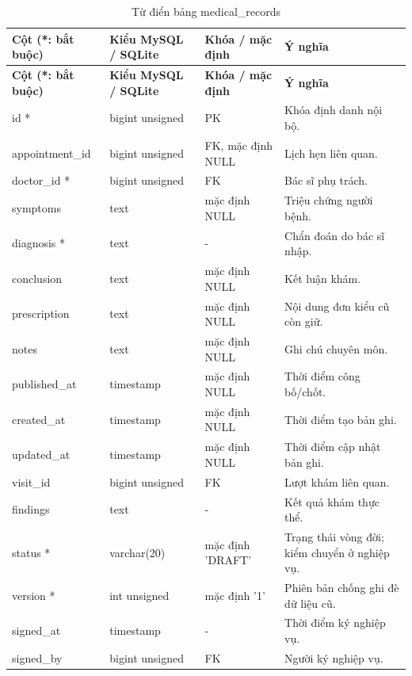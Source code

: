 {\fontsize{10}{12}\selectfont\setlength{\tabcolsep}{3pt}\renewcommand{\arraystretch}{1.12}
\begin{longtable}{@{}L{\textwidth-4.86pt\relax} L{\textwidth-3.96pt\relax} L{\textwidth-2.88pt\relax} L{\textwidth-6.3pt\relax}@{}}
\caption{Từ điển bảng medical\_\allowbreak{}records}\\
\toprule
\textbf{Cột (*:\allowbreak{} bắt buộc)} & \textbf{Kiểu My\allowbreak{}SQL /\allowbreak{} SQLite} & \textbf{Khóa /\allowbreak{} mặc định} & \textbf{Ý nghĩa}\\\midrule
\endfirsthead
\toprule
\textbf{Cột (*:\allowbreak{} bắt buộc)} & \textbf{Kiểu My\allowbreak{}SQL /\allowbreak{} SQLite} & \textbf{Khóa /\allowbreak{} mặc định} & \textbf{Ý nghĩa}\\\midrule
\endhead
\bottomrule\endlastfoot
id * & bigint unsigned & PK & Khóa định danh nội bộ.\allowbreak{}\\[1pt]
appointment\_\allowbreak{}id & bigint unsigned & FK, mặc định NULL & Lịch hẹn liên quan.\allowbreak{}\\[1pt]
doctor\_\allowbreak{}id * & bigint unsigned & FK & Bác sĩ phụ trách.\allowbreak{}\\[1pt]
symptoms & text & mặc định NULL & Triệu chứng người bệnh.\allowbreak{}\\[1pt]
diagnosis * & text & - & Chẩn đoán do bác sĩ nhập.\allowbreak{}\\[1pt]
conclusion & text & mặc định NULL & Kết luận khám.\allowbreak{}\\[1pt]
prescription & text & mặc định NULL & Nội dung đơn kiểu cũ còn giữ.\allowbreak{}\\[1pt]
notes & text & mặc định NULL & Ghi chú chuyên môn.\allowbreak{}\\[1pt]
published\_\allowbreak{}at & timestamp & mặc định NULL & Thời điểm công bố/\allowbreak{}chốt.\allowbreak{}\\[1pt]
created\_\allowbreak{}at & timestamp & mặc định NULL & Thời điểm tạo bản ghi.\allowbreak{}\\[1pt]
updated\_\allowbreak{}at & timestamp & mặc định NULL & Thời điểm cập nhật bản ghi.\allowbreak{}\\[1pt]
visit\_\allowbreak{}id & bigint unsigned & FK & Lượt khám liên quan.\allowbreak{}\\[1pt]
findings & text & - & Kết quả khám thực thể.\allowbreak{}\\[1pt]
status * & varchar(20) & mặc định 'DRAFT' & Trạng thái vòng đời; kiểm chuyển ở nghiệp vụ.\allowbreak{}\\[1pt]
version * & int unsigned & mặc định '1' & Phiên bản chống ghi đè dữ liệu cũ.\allowbreak{}\\[1pt]
signed\_\allowbreak{}at & timestamp & - & Thời điểm ký nghiệp vụ.\allowbreak{}\\[1pt]
signed\_\allowbreak{}by & bigint unsigned & FK & Người ký nghiệp vụ.\allowbreak{}\\[1pt]
\end{longtable}}
